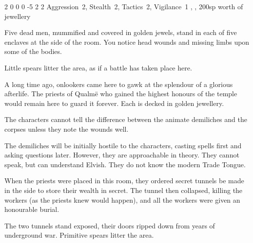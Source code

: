\begin{multicols}{2}

  {2}%
  {0}%
  {{0}%
  {0}%
  {-5}}%
  {2}%
  {2}%
  {Aggression~2, Stealth~2, Tactics~2, Vigilance~1}%
  {\shortsword, \completeplate, 200sp worth of jewellery}%
  {}


\begin{boxtext}

  Five dead men, mummified and covered in golden jewels, stand in each of five enclaves at the side of the room.
  You notice head wounds and missing limbs upon some of the bodies.

  Little spears litter the area, as if a battle has taken place here.

\end{boxtext}

\begin{exampletext}

A long time ago, onlookers came here to gawk at the splendour of a glorious afterlife.  The priests of Qualm\"{e} who gained the highest honours of the temple would remain here to guard it forever.  Each is decked in golden jewellery.

\end{exampletext}


The characters cannot tell the difference between the animate demiliches and the corpses unless they note the wounds well.

The demiliches will be initially hostile to the characters, casting spells first and asking questions later.
However, they are approachable in theory.
They cannot speak, but can understand Elvish.
They do not know the modern Trade Tongue.


\begin{exampletext}

When the priests were placed in this room, they ordered secret tunnels be made in the side to store their wealth in secret.
The tunnel then collapsed, killing the workers (as the priests knew would happen), and all the workers were given an honourable burial.

\end{exampletext}

The two tunnels stand exposed, their doors ripped down from years of underground war.  Primitive spears litter the area.


\end{multicols}
